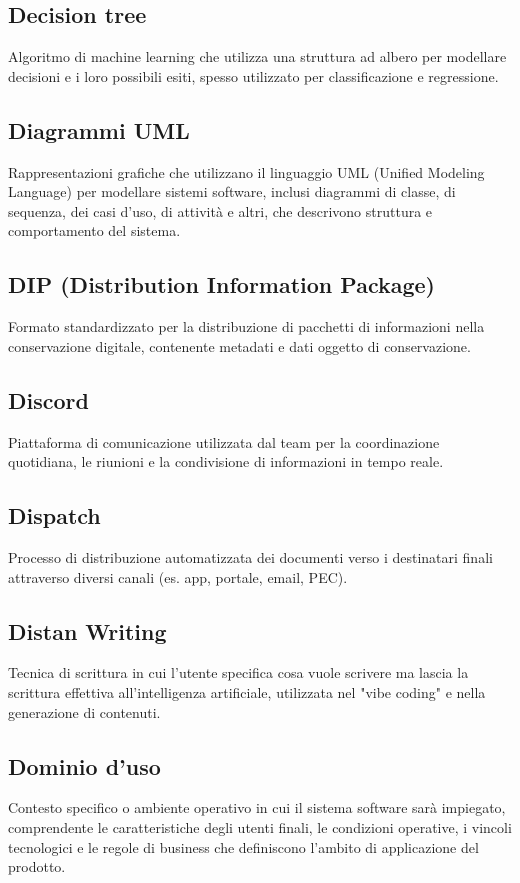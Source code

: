 \documentclass[a4paper,11pt]{article}
\begin{document}
\subsection{Decision tree}
Algoritmo di machine learning che utilizza una struttura ad albero per modellare decisioni e i loro possibili esiti, spesso utilizzato per classificazione e regressione.

\subsection{Diagrammi UML}
Rappresentazioni grafiche che utilizzano il linguaggio UML (Unified Modeling Language) per modellare sistemi software, inclusi diagrammi di classe, di sequenza, dei casi d'uso, di attività e altri, che descrivono struttura e comportamento del sistema.

\subsection{DIP (Distribution Information Package)}
Formato standardizzato per la distribuzione di pacchetti di informazioni nella conservazione digitale, contenente metadati e dati oggetto di conservazione.

\subsection{Discord}
Piattaforma di comunicazione utilizzata dal team per la coordinazione quotidiana, le riunioni e la condivisione di informazioni in tempo reale.

\subsection{Dispatch}
Processo di distribuzione automatizzata dei documenti verso i destinatari finali attraverso diversi canali (es. app, portale, email, PEC).

\subsection{Distan Writing}
Tecnica di scrittura in cui l'utente specifica cosa vuole scrivere ma lascia la scrittura effettiva all'intelligenza artificiale, utilizzata nel "vibe coding" e nella generazione di contenuti.

\subsection{Dominio d'uso}
Contesto specifico o ambiente operativo in cui il sistema software sarà impiegato, comprendente le caratteristiche degli utenti finali, le condizioni operative, i vincoli tecnologici e le regole di business che definiscono l'ambito di applicazione del prodotto.
\end{document}
